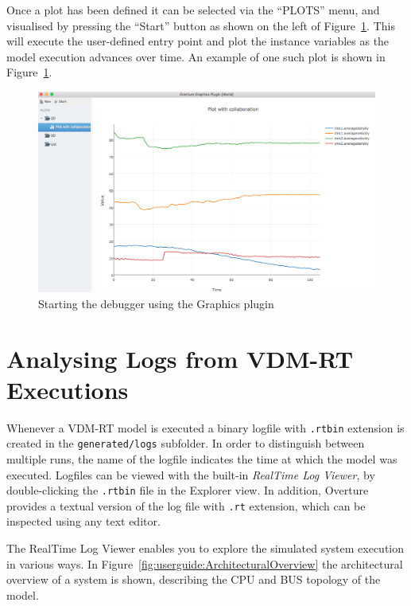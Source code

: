\documentclass{overturerepchap}
\begin{document}
Once a plot has been defined it can be selected via the ``PLOTS''
menu, and visualised by pressing the ``Start'' button as shown on the
left of Figure~\ref{fig:graphicsplot}. This will execute the
user-defined entry point and plot the instance variables as the model
execution advances over time. An example of one such plot is shown in
Figure~\ref{fig:graphicsplot}.

\begin{figure}[htbp]
\begin{center}
\includegraphics[width=\textwidth]{screenDumps/graphicsplot}
\caption{Starting the debugger using the Graphics plugin\label{fig:graphicsplot}}
\end{center}
\end{figure}

\chapter{Analysing Logs from VDM-RT Executions}\label{sec:showlog}

Whenever a VDM-RT model is executed a binary logfile with \texttt{.rtbin} extension
is created in the \texttt{generated/logs} subfolder. In order to distinguish between multiple runs,
the name of the logfile indicates the time at which the model was executed. Logfiles can be
viewed with the built-in \emph{RealTime Log Viewer},
by double-clicking the \texttt{.rtbin} file in the Explorer view. In addition, Overture provides
a textual version of the log file with \texttt{.rt} extension,
which can be inspected using any text editor.

The RealTime Log Viewer enables
you to explore the simulated system execution in various ways. In
Figure~\ref{fig:userguide:ArchitecturalOverview} the architectural
overview of a system is shown, describing the CPU and BUS topology of
the model.
\end{document}
